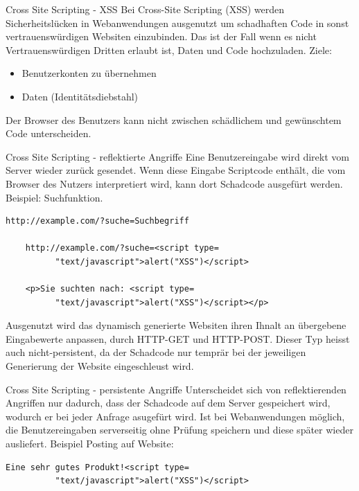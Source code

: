 \documentclass[10pt]{beamer}
\begin{document}
\begin{frame}[fragile]{Cross Site Scripting - XSS}
  Bei Cross-Site Scripting (XSS) werden Sicherheitsl\"ucken in Webanwendungen ausgenutzt um schadhaften Code in sonst vertrauensw\"urdigen Websiten einzubinden.
  Das ist der Fall wenn es nicht Vertrauensw\"urdigen Dritten erlaubt ist, Daten und Code hochzuladen.
  \newline
  Ziele:
  \begin{itemize}
    \item Benutzerkonten zu \"ubernehmen
    \item Daten (Identit\"atsdiebstahl)
  \end{itemize}
  Der Browser des Benutzers kann nicht zwischen sch\"adlichem und gew\"unschtem Code unterscheiden.
\end{frame}

\begin{frame}[fragile]{Cross Site Scripting - reflektierte Angriffe}
  Eine Benutzereingabe wird direkt vom Server wieder zur\"uck gesendet.
  Wenn diese Eingabe Scriptcode enth\"alt, die vom Browser des Nutzers interpretiert wird, kann dort Schadcode ausgef\"urt werden.
  Beispiel: Suchfunktion.
  \begin{lstlisting}[style=CStyle]
    http://example.com/?suche=Suchbegriff

    http://example.com/?suche=<script type=
          "text/javascript">alert("XSS")</script>

    <p>Sie suchten nach: <script type=
          "text/javascript">alert("XSS")</script></p>
  \end{lstlisting}
  Ausgenutzt wird das dynamisch generierte Websiten ihren Ihnalt an \"ubergebene Eingabewerte anpassen, durch HTTP-GET und HTTP-POST.
  Dieser Typ heisst auch nicht-persistent, da der Schadcode nur tempr\"ar bei der jeweiligen Generierung der Website eingeschleust wird.
\end{frame}

\begin{frame}[fragile]{Cross Site Scripting - persistente Angriffe}
  Unterscheidet sich von reflektierenden Angriffen nur dadurch, dass der Schadcode auf dem Server gespeichert wird, wodurch er bei jeder Anfrage asugef\"urt wird.
  Ist bei Webanwendungen m\"oglich, die Benutzereingaben serverseitig ohne Pr\"ufung speichern und diese sp\"ater wieder ausliefert.
  Beispiel Posting auf Website:
  \begin{lstlisting}[style=CStyle]
    Eine sehr gutes Produkt!<script type=
          "text/javascript">alert("XSS")</script>
  \end{lstlisting}
\end{frame}
\end{document}
